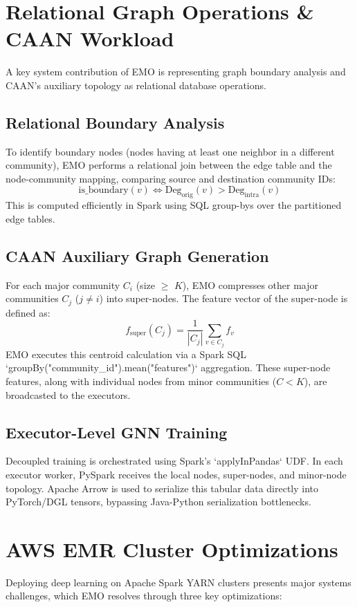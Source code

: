 \documentclass[conference,compsoc]{IEEEtran}
\begin{document}
\section{Relational Graph Operations \& CAAN Workload}
A key system contribution of EMO is representing graph boundary analysis and CAAN's auxiliary topology as relational database operations.

\subsection{Relational Boundary Analysis}
To identify boundary nodes (nodes having at least one neighbor in a different community), EMO performs a relational join between the edge table and the node-community mapping, comparing source and destination community IDs:
\begin{equation}
\text{is\_boundary}(v) \iff \text{Deg}_{\text{orig}}(v) > \text{Deg}_{\text{intra}}(v)
\end{equation}
This is computed efficiently in Spark using SQL group-bys over the partitioned edge tables.

\subsection{CAAN Auxiliary Graph Generation}
For each major community $C_i$ (size $\ge$ $K$), EMO compresses other major communities $C_j$ ($j \neq i$) into super-nodes. The feature vector of the super-node is defined as:
\begin{equation}
f_{\text{super}}(C_j) = \frac{1}{|C_j|} \sum_{v \in C_j} f_v
\end{equation}
EMO executes this centroid calculation via a Spark SQL `groupBy("community_id").mean("features")` aggregation. These super-node features, along with individual nodes from minor communities ($C < K$), are broadcasted to the executors.

\subsection{Executor-Level GNN Training}
Decoupled training is orchestrated using Spark's `applyInPandas` UDF. In each executor worker, PySpark receives the local nodes, super-nodes, and minor-node topology. Apache Arrow is used to serialize this tabular data directly into PyTorch/DGL tensors, bypassing Java-Python serialization bottlenecks.

\section{AWS EMR Cluster Optimizations}
Deploying deep learning on Apache Spark YARN clusters presents major systems challenges, which EMO resolves through three key optimizations:
\end{document}
